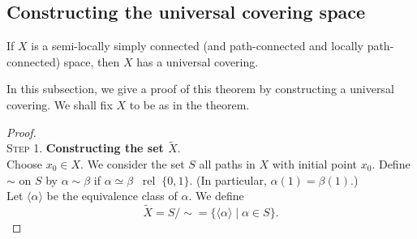 \documentclass[12pt]{article}
\newcommand{\rel}{\;\;\operatorname{rel}\;}
\begin{document}
\subsection{Constructing the universal covering space}
\begin{thm}
	If $X$ is a semi-locally simply connected (and path-connected and locally path-connected) space, then $X$ has a universal covering.
\end{thm}
In this subsection, we give a proof of this theorem by constructing a universal covering. We shall fix $X$ to be as in the theorem.\\
%
%
\begin{proof} \phantom{hi}\\
\textsc{Step 1.} \textbf{Constructing the set $\tilde{X}.$}\\
Choose $x_0 \in X.$ We consider the set $S$ all paths in $X$ with initial point $x_0.$ Define $\sim$ on $S$ by $\alpha \sim \beta$ if $\alpha\simeq\beta\rel\{0, 1\}.$ (In particular, $\alpha(1) = \beta(1).$)\\
Let $\langle \alpha\rangle$ be the equivalence class of $\alpha.$ We define
\begin{equation*} 
	\tilde{X} = S/{\sim} = \{\langle \alpha\rangle \mid \alpha \in S\}.
\end{equation*}

\dotfill


\end{proof}
\end{document}
